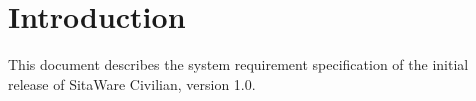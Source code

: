 \chapter{Introduction}

This document describes the system requirement specification of the initial release of SitaWare Civilian, version 1.0.

%


